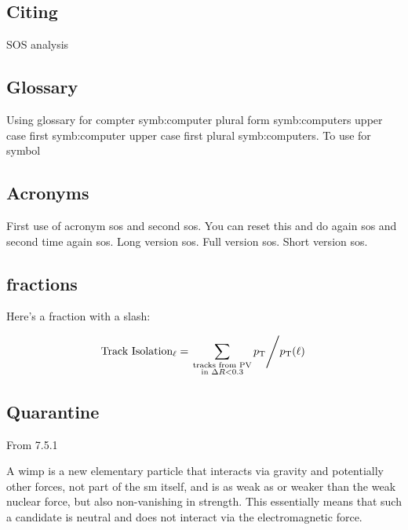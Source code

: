 \subsection{Citing}
\cite{sos} SOS analysis 
\subsection{Glossary}
Using glossary for compter \gls{symb:computer} plural form \glspl{symb:computer}
upper case first \Gls{symb:computer} upper case first plural \Glspl{symb:computer}. To use for symbol 

\subsection{Acronyms}
First use of acronym \gls{sos} and second \gls{sos}. 
You can reset this and do again  \gls{sos} and second time again \gls{sos}. 
Long version \acrlong{sos}.
Full version \acrfull{sos}.
Short version \acrshort{sos}.

\subsection{fractions}

Here's a fraction with a slash:

\begin{equation}
\text{Track Isolation}_\ell = \left.  \sum_{\substack{\text{tracks from PV}\\ \text{in } \Delta R<0.3}}p_{\mathrm{T}} \middle/ p_{\mathrm{T}}(\ell)  \right.
\end{equation}

\subsection{Quarantine}

From 7.5.1

A \gls{wimp} is a new elementary particle that interacts via gravity and potentially other forces, not part of the \gls{sm} itself, and is as weak as or weaker than the weak nuclear force, but also non-vanishing in strength. This essentially means that such a candidate is neutral and does not interact via the electromagnetic force.

